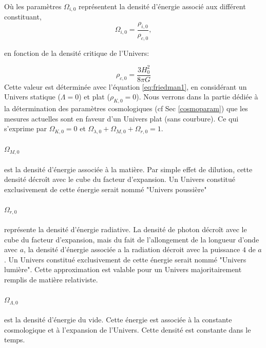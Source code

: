 Où les paramètres $\Omega_{i,0}$ représentent la densité d'énergie associé aux différent constituant, 
\begin{equation}
 \Omega_{i,0} = \frac{\rho_{i,0}}{\rho_{c,0}},
 \end{equation}

en fonction de la densité critique de l'Univers:

\begin{equation}
\rho_{c,0} = \frac{3H_0^2}{8\pi G}
 \end{equation}
Cette valeur est déterminée avec l'équation \ref{eq:friedman1}, en considérant un Univers statique ($\Lambda=0$) et plat ($\rho_{K,0}=0$).
Nous verrons dans la partie dédiée à la détermination des paramètres cosmologiques (cf Sec \ref{cosmoparam}) que les mesures actuelles sont en faveur d'un Univers plat (sans courbure).
Ce qui s'exprime par $\Omega_{K,0} = 0$ et $\Omega_{\lambda,0} +  \Omega_{M,0} + \Omega_{r,0} =1$.

\paragraph{$\Omega_{M,0}$} est la densité d'énergie associée à la matière. %
Par simple effet de dilution, cette densité décroît avec le cube du facteur d'expansion.
Un Univers constitué exclusivement de cette énergie serait nommé "Univers poussière"

\paragraph{$\Omega_{r,0}$} représente la densité d'énergie radiative.
La densité de photon décroît avec le cube du facteur d'expansion, mais du fait de l'allongement de la longueur d'onde avec $a$, la densité d'énergie associée a la radiation décroit avec la puissance $4$ de $a$.
Un Univers constitué exclusivement de cette énergie serait nommé "Univers lumière".
Cette approximation est valable pour un Univers majoritairement remplis de matière relativiste.

\paragraph{$\Omega_{\Lambda,0}$} est la densité d’énergie du vide.
Cette énergie est associée à la constante cosmologique et à l'expansion de l'Univers. 
Cette densité est constante dans le temps.

